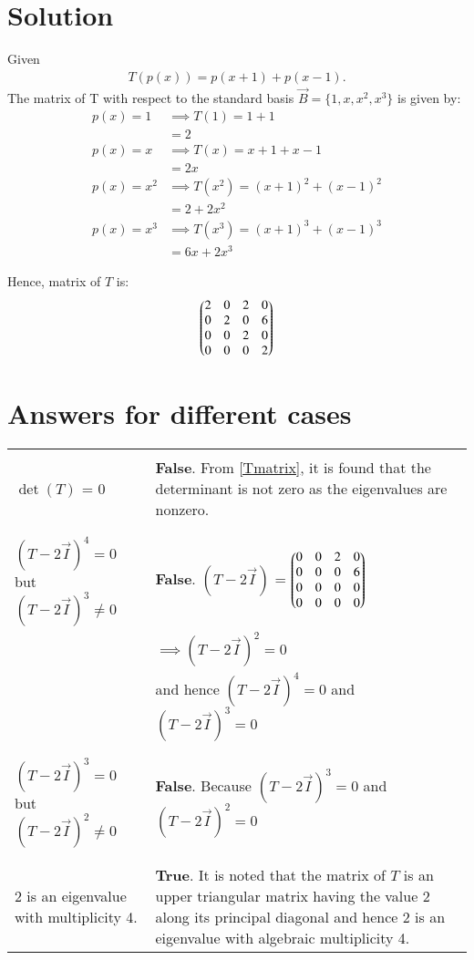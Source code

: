 \documentclass[journal,12pt,twocolumn]{IEEEtran}
\begin{document}
\section{Solution}
Given 
\begin{align}
T(p(x)) = p(x+1)+p(x-1).
\end{align}
The matrix of T with respect to the standard basis $\vec{B}=\{1, x, x^2, x^3\}$ is given by:
\begin{align}
p(x)=1 &\implies T(1) = 1 + 1 \nonumber \\
&= 2\\
p(x)=x &\implies T(x) = x+1 + x-1 \nonumber\\
&= 2x \\
p(x)=x^2 &\implies T(x^2) = (x+1)^2 + (x-1)^2 \nonumber\\
&= 2 + 2x^2 \\
p(x)=x^3 &\implies T(x^3) = (x+1)^3 + (x-1)^3 \nonumber\\
&= 6x + 2x^3 
\end{align}

Hence, matrix of $T$ is:
\begin{align}
	\begin{pmatrix}2 & 0 & 2 & 0 \\ 0 & 2 & 0 & 6\\ 0 & 0 & 2 & 0\\0 & 0 & 0 & 2\end{pmatrix}\label{Tmatrix}
\end{align} 
\section{Answers for different cases}
\begin{table}[h]
	\begin{tabular}{|m{3cm}|m{5cm}|}
		\hline
		&\\
		$\det(T)$ = 0 
		& \textbf{False}. From \eqref{Tmatrix}, it is found that the determinant is not zero as the eigenvalues are nonzero.\\
		& \\
		\hline
		&\\
		$(T-2\vec{I})^4=0$ but $(T-2\vec{I})^3 \ne 0$
		& \textbf{False}. 
		$(T-2\vec{I})$
		 = $\begin{pmatrix}0 & 0 & 2 & 0 \\ 0 & 0 & 0 & 6\\ 0 & 0 & 0 & 0\\0 & 0 & 0 & 0\end{pmatrix}$\\
		& $\implies (T - 2\vec{I})^2 = 0$\\
		&and hence $(T-2\vec{I})^4=0$ and $(T-2\vec{I})^3 = 0$ \\
		&\\
		\hline
		&\\
	    $(T-2\vec{I})^3=0$ but $(T-2\vec{I})^2 \ne 0$
		& \textbf{False}. Because $(T-2\vec{I})^3=0$ and $(T-2\vec{I})^2 = 0$\\
		&\\
		\hline
		&\\
		2 is an eigenvalue with multiplicity 4.
		& \textbf{True}. It is noted that the matrix of $T$ is an upper triangular matrix having the value 2 along its principal diagonal and hence 2 is an eigenvalue with algebraic multiplicity 4.\\
		\hline
	\end{tabular}
\end{table}
\end{document}
